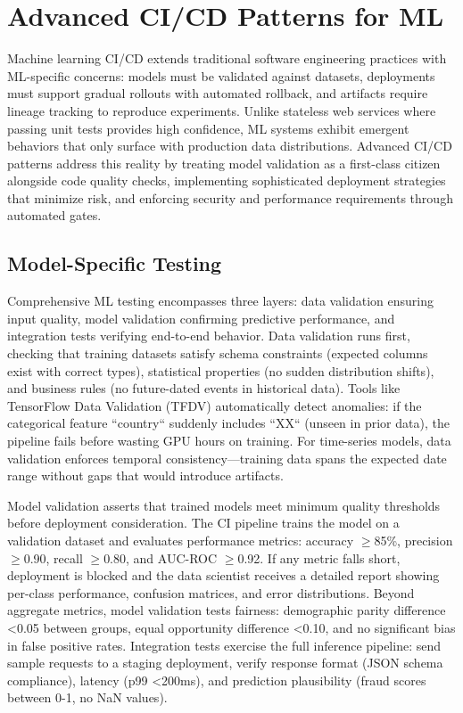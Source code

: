 \section{Advanced CI/CD Patterns for ML}

Machine learning CI/CD extends traditional software engineering practices with ML-specific concerns: models must be validated against datasets, deployments must support gradual rollouts with automated rollback, and artifacts require lineage tracking to reproduce experiments. Unlike stateless web services where passing unit tests provides high confidence, ML systems exhibit emergent behaviors that only surface with production data distributions. Advanced CI/CD patterns address this reality by treating model validation as a first-class citizen alongside code quality checks, implementing sophisticated deployment strategies that minimize risk, and enforcing security and performance requirements through automated gates.

\subsection{Model-Specific Testing}

Comprehensive ML testing encompasses three layers: data validation ensuring input quality, model validation confirming predictive performance, and integration tests verifying end-to-end behavior. Data validation runs first, checking that training datasets satisfy schema constraints (expected columns exist with correct types), statistical properties (no sudden distribution shifts), and business rules (no future-dated events in historical data). Tools like TensorFlow Data Validation (TFDV) automatically detect anomalies: if the categorical feature ``country`` suddenly includes ``XX`` (unseen in prior data), the pipeline fails before wasting GPU hours on training. For time-series models, data validation enforces temporal consistency---training data spans the expected date range without gaps that would introduce artifacts.

Model validation asserts that trained models meet minimum quality thresholds before deployment consideration. The CI pipeline trains the model on a validation dataset and evaluates performance metrics: accuracy \ensuremath{\geq}85\%, precision \ensuremath{\geq}0.90, recall \ensuremath{\geq}0.80, and AUC-ROC \ensuremath{\geq}0.92. If any metric falls short, deployment is blocked and the data scientist receives a detailed report showing per-class performance, confusion matrices, and error distributions. Beyond aggregate metrics, model validation tests fairness: demographic parity difference <0.05 between groups, equal opportunity difference <0.10, and no significant bias in false positive rates. Integration tests exercise the full inference pipeline: send sample requests to a staging deployment, verify response format (JSON schema compliance), latency (p99 <200ms), and prediction plausibility (fraud scores between 0-1, no NaN values).

